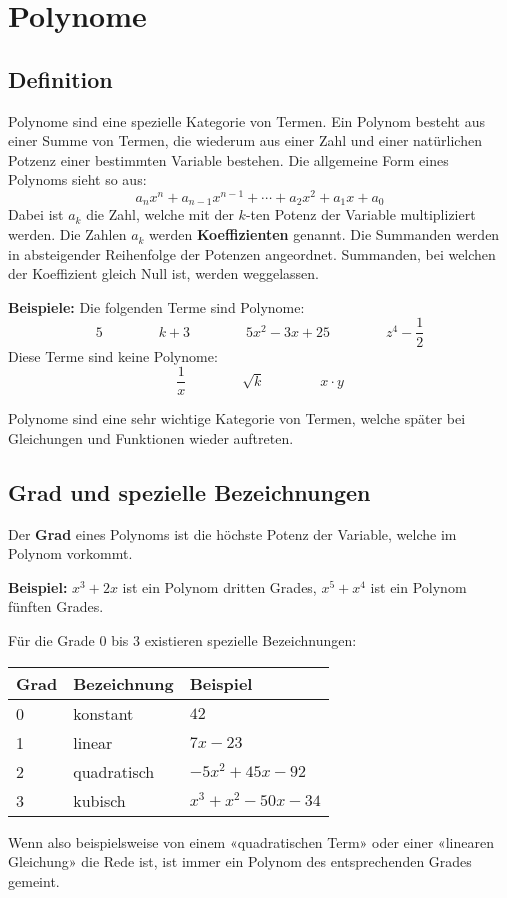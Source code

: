 \newpage
\section{Polynome}

\subsection{Definition}

Polynome sind eine spezielle Kategorie von Termen. Ein Polynom besteht aus einer Summe von Termen, die wiederum aus einer Zahl und einer natürlichen Potzenz einer bestimmten Variable bestehen. Die allgemeine Form eines Polynoms sieht so aus:
\[
  a_{n}x^{n} + a_{n-1}x^{n-1} + \cdots + a_{2}x^{2} + a_{1}x + a_{0}
\]
Dabei ist $a_{k}$ die Zahl, welche mit der $k$-ten Potenz der Variable multipliziert werden. Die Zahlen $a_{k}$ werden \textbf{Koeffizienten} genannt. Die Summanden werden in absteigender Reihenfolge der Potenzen angeordnet. Summanden, bei welchen der Koeffizient gleich Null ist, werden weggelassen.

\begin{example}
  \textbf{Beispiele:} Die folgenden Terme sind Polynome:
  \[
    5 \qquad\qquad k+3 \qquad\qquad 5x^{2}-3x+25 \qquad\qquad z^{4}-\frac{1}{2}
  \]
  Diese Terme sind keine Polynome:
  \[
    \frac{1}{x} \qquad\qquad \sqrt{k} \qquad\qquad x\cdot y
  \]
\end{example}

Polynome sind eine sehr wichtige Kategorie von Termen, welche später bei Gleichungen und Funktionen wieder auftreten.

\subsection{Grad und spezielle Bezeichnungen}

Der \textbf{Grad} eines Polynoms ist die höchste Potenz der Variable, welche im Polynom vorkommt.

\begin{example}
  \textbf{Beispiel:} $x^{3}+2x$ ist ein Polynom dritten Grades, $x^{5}+x^{4}$ ist ein Polynom fünften Grades.
\end{example}

Für die Grade 0 bis 3 existieren spezielle Bezeichnungen:
\begin{center}
  \def\arraystretch{1.1}
  \begin{tabularx}{0.9\textwidth}{XXR}
  \toprule
    \textbf{Grad} & \textbf{Bezeichnung} & \textbf{Beispiel} \\
   & konstant & $42$ \\
   & linear & $7x-23$ \\
   & quadratisch & $-5x^{2}+45x-92$ \\
   & kubisch & $x^{3}+x^{2}-50x-34$ \\
  \bottomrule
  \end{tabularx}
\end{center}

Wenn also beispielsweise von einem «quadratischen Term» oder einer «linearen Gleichung» die Rede ist, ist immer ein Polynom des entsprechenden Grades gemeint.
